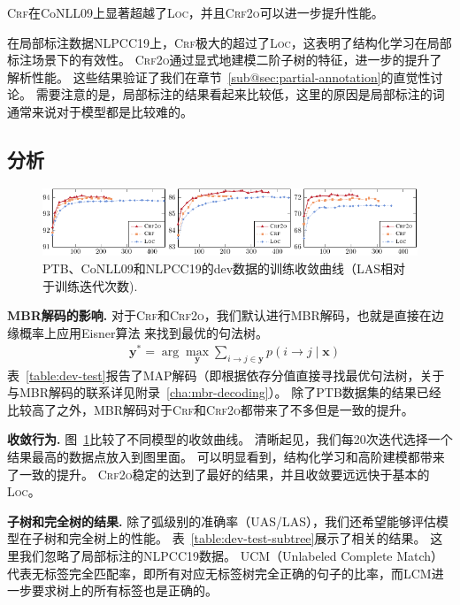\textsc{Crf}在CoNLL09上显著超越了\textsc{Loc}，并且\textsc{Crf2o}可以进一步提升性能。

在局部标注数据NLPCC19上，\textsc{Crf}极大的超过了\textsc{Loc}，这表明了结构化学习在局部标注场景下的有效性。
\textsc{Crf2o}通过显式地建模二阶子树的特征，进一步的提升了解析性能。
这些结果验证了我们在章节~\ref{sub@sec:partial-annotation}的直觉性讨论。
需要注意的是，局部标注的结果看起来比较低，这里的原因是局部标注的词通常来说对于模型都是比较难的。

\subsection{分析}
\label{sub@sec:dep-analysis}

\begin{figure}[tb!]
	\centering
	\includegraphics[width=\textwidth]{figures/convergency.pdf}
	\caption{
	PTB、CoNLL09和NLPCC19的dev数据的训练收敛曲线（LAS相对于训练迭代次数).}
	\label{fig:convergency}
\end{figure}

\noindent\textbf{MBR解码的影响.}
对于\textsc{Crf}和\textsc{Crf2o}，我们默认进行MBR解码，也就是直接在边缘概率上应用Eisner算法 \citep{smith-smith-2007-probabilistic}来找到最优的句法树。
\begin{equation}
	\begin{split}
		& {\boldsymbol{y}}^* = \arg\max_{\boldsymbol{y}} \sum_{i \rightarrow j \in \boldsymbol{y}}{p(i \rightarrow j\mid\boldsymbol{x})}
	\end{split}
\end{equation}
表~\ref{table:dev-test}报告了MAP解码（即根据依存分值直接寻找最优句法树，关于与MBR解码的联系详见附录~\ref{cha:mbr-decoding}）。
除了PTB数据集的结果已经比较高了之外，MBR解码对于\textsc{Crf}和\textsc{Crf2o}都带来了不多但是一致的提升。

\noindent\textbf{收敛行为.}
图~\ref{fig:convergency}比较了不同模型的收敛曲线。
清晰起见，我们每20次迭代选择一个结果最高的数据点放入到图里面。
可以明显看到，结构化学习和高阶建模都带来了一致的提升。
\textsc{Crf2o}稳定的达到了最好的结果，并且收敛要远远快于基本的\textsc{Loc}。



\noindent\textbf{子树和完全树的结果.}
除了弧级别的准确率（UAS/LAS），我们还希望能够评估模型在子树和完全树上的性能。
表~\ref{table:dev-test-subtree}展示了相关的结果。
这里我们忽略了局部标注的NLPCC19数据。
UCM（Unlabeled Complete Match）代表无标签完全匹配率，即所有对应无标签树完全正确的句子的比率，而LCM进一步要求树上的所有标签也是正确的。

